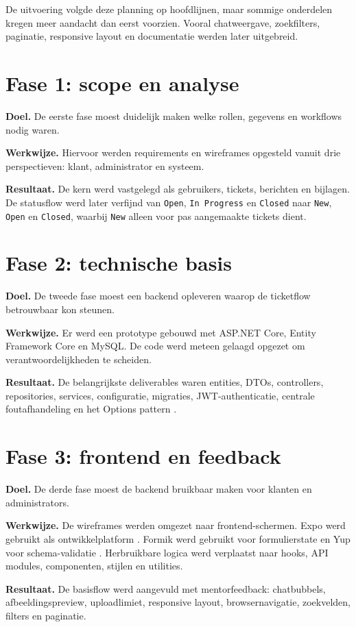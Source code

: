 De uitvoering volgde deze planning op hoofdlijnen, maar sommige onderdelen kregen meer aandacht dan eerst voorzien. Vooral chatweergave, zoekfilters, paginatie, responsive layout en documentatie werden later uitgebreid.

\section{Fase 1: scope en analyse}

\textbf{Doel.} De eerste fase moest duidelijk maken welke rollen, gegevens en workflows nodig waren.\par\noindent\textbf{Werkwijze.} Hiervoor werden requirements en wireframes opgesteld vanuit drie perspectieven: klant, administrator en systeem.\par\noindent\textbf{Resultaat.} De kern werd vastgelegd als gebruikers, tickets, berichten en bijlagen. De statusflow werd later verfijnd van \texttt{Open}, \texttt{In Progress} en \texttt{Closed} naar \texttt{New}, \texttt{Open} en \texttt{Closed}, waarbij \texttt{New} alleen voor pas aangemaakte tickets dient.

\section{Fase 2: technische basis}

\textbf{Doel.} De tweede fase moest een backend opleveren waarop de ticketflow betrouwbaar kon steunen.\par\noindent\textbf{Werkwijze.} Er werd een prototype gebouwd met ASP.NET Core, Entity Framework Core en MySQL. De code werd meteen gelaagd opgezet om verantwoordelijkheden te scheiden.\par\noindent\textbf{Resultaat.} De belangrijkste deliverables waren entities, DTOs, controllers, repositories, services, configuratie, migraties, JWT-authenticatie, centrale foutafhandeling en het Options pattern \autocite{MicrosoftOptionsPattern2026}.

\section{Fase 3: frontend en feedback}

\textbf{Doel.} De derde fase moest de backend bruikbaar maken voor klanten en administrators.\par\noindent\textbf{Werkwijze.} De wireframes werden omgezet naar frontend-schermen. Expo werd gebruikt als ontwikkelplatform \autocite{ExpoDocs2026}. Formik werd gebruikt voor formulierstate en Yup voor schema-validatie \autocite{FormikDocs2026,YupDocs2026}. Herbruikbare logica werd verplaatst naar hooks, API modules, componenten, stijlen en utilities.\par\noindent\textbf{Resultaat.} De basisflow werd aangevuld met mentorfeedback: chatbubbels, afbeeldingspreview, uploadlimiet, responsive layout, browsernavigatie, zoekvelden, filters en paginatie.

